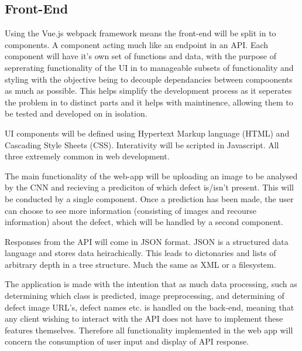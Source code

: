     \subsection{Front-End}
      Using the Vue.js webpack framework means the front-end will be split in to components. A component acting much like an endpoint in an API. Each component will have it's own set of functions and data, with the purpose of seprerating functionality of the UI in to manageable subsets of functionality and styling with the objective being to decouple dependancies between compoonents as much as possible. This helps simplify the development process as it seperates the problem in to distinct parts and it helps with maintinence, allowing them to be tested and developed on in isolation.
      \par
      UI components will be defined using Hypertext Markup language (HTML) and Cascading Style Sheets (CSS). Interativity will be scripted in Javascript. All three extremely common in web development. %
      \par
      The main functionality of the web-app will be uploading an image to be analysed by the CNN and recieving a prediciton of which defect is/isn't present. This will be conducted by a single component. Once a prediction has been made, the user can choose to see more information (consisting of images and recourse information) about the defect, which will be handled by a second component.
      \par
      Responses from the API will come in JSON format. JSON is a structured data language and stores data heirachically. This leads to dictonaries and lists of arbitrary depth in a tree structure. Much the same as XML or a filesystem.
      \par
      The application is made with the intention that as much data processing, such as determining which class is predicted, image preprocessing, and determining of defect image URL's, defect names etc. is handled on the back-end, meaning that any client wishing to interact with the API does not have to implement these features themselves. Therefore all functionality implemented in the web app will concern the consumption of user input and display of API response.
      \par
